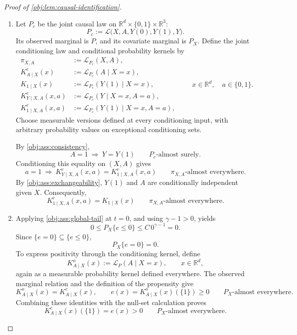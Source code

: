 \begin{proof}[Proof of \cref{obj:lem:causal-identification}]
\begin{enumerate}
\item Let \(P_c\) be the joint causal law on
\(\mathbb R^d\times\{0,1\}\times\mathbb R^3\):
\[
P_c:=\mathcal L\bigl(X,A,Y(0),Y(1),Y\bigr).
\]
Its observed marginal is \(P\), and its covariate marginal is \(P_X\). Define the joint conditioning law and conditional probability kernels by
\[
\begin{aligned}
\pi_{X,A}&:=\mathcal L_{P_c}(X,A),\\
K^c_{A\mid X}(x)&:=\mathcal L_{P_c}(A\mid X=x),\\
K_{1\mid X}(x)&:=\mathcal L_{P_c}(Y(1)\mid X=x),\\
K^c_{Y\mid X,A}(x,a)&:=\mathcal L_{P_c}(Y\mid X=x,A=a),\\
K^c_{1\mid X,A}(x,a)&:=\mathcal L_{P_c}(Y(1)\mid X=x,A=a),
\end{aligned}
\qquad x\in\mathbb R^d,\quad a\in\{0,1\}.
\]
Choose measurable versions defined at every conditioning input, with arbitrary probability values on exceptional conditioning sets.

By \cref{obj:ass:consistency},
\[
A=1\ \Longrightarrow\ Y=Y(1)
\qquad P_c\text{-almost surely}.
\]
Conditioning this equality on \((X,A)\) gives
\[
a=1\ \Longrightarrow\
K^c_{Y\mid X,A}(x,a)=K^c_{1\mid X,A}(x,a)
\qquad \pi_{X,A}\text{-almost everywhere}.
\]
By \cref{obj:ass:exchangeability}, \(Y(1)\) and \(A\) are conditionally independent given \(X\). Consequently,
\[
K^c_{1\mid X,A}(x,a)=K_{1\mid X}(x)
\qquad \pi_{X,A}\text{-almost everywhere}.
\]

\item Applying \cref{obj:ass:global-tail} at \(t=0\), and using \(\gamma-1>0\), yields
\[
0\le P_X\{e\le0\}\le C\,0^{\gamma-1}=0.
\]
Since \(\{e=0\}\subseteq\{e\le0\}\),
\[
P_X\{e=0\}=0.
\]
To express positivity through the conditioning kernel, define
\[
K^o_{A\mid X}(x):=\mathcal L_P(A\mid X=x),
\qquad x\in\mathbb R^d,
\]
again as a measurable probability kernel defined everywhere. The observed marginal relation and the definition of the propensity give
\[
K^o_{A\mid X}(x)=K^c_{A\mid X}(x),
\qquad
e(x)=K^o_{A\mid X}(x)(\{1\})\ge0
\qquad P_X\text{-almost everywhere}.
\]
Combining these identities with the null-set calculation proves
\[
K^c_{A\mid X}(x)(\{1\})=e(x)>0
\qquad P_X\text{-almost everywhere}.
\]


\end{enumerate}
\end{proof}
